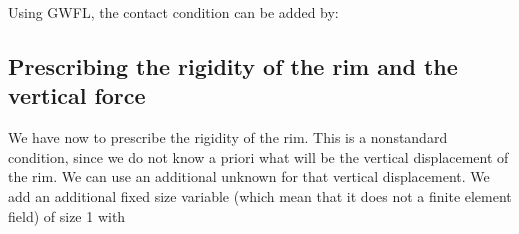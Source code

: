 \documentclass[a4paper,11pt,english]{sphinxmanual}
\begin{document}
\sphinxAtStartPar
Using GWFL, the contact condition can be added by:

\begin{sphinxVerbatim}[commandchars=\\\{\}]
 \PYG{p}{[}\PYG{p}{]}
  
 
                     
 
           
\end{sphinxVerbatim}


\subsection{Prescribing the rigidity of the rim and the vertical force}
\label{\detokenize{tutorial/wheel:prescribing-the-rigidity-of-the-rim-and-the-vertical-force}}
\sphinxAtStartPar
We have now to prescribe the rigidity of the rim. This is a non\sphinxhyphen{}standard condition, since we do not know a priori what will be the vertical displacement of the rim. We can use an additional unknown for that vertical displacement. We add an additional fixed size variable  (which mean that it does not a finite element field) of size 1 with

\begin{sphinxVerbatim}[commandchars=\\\{\}]
 
\end{sphinxVerbatim}
\end{document}
